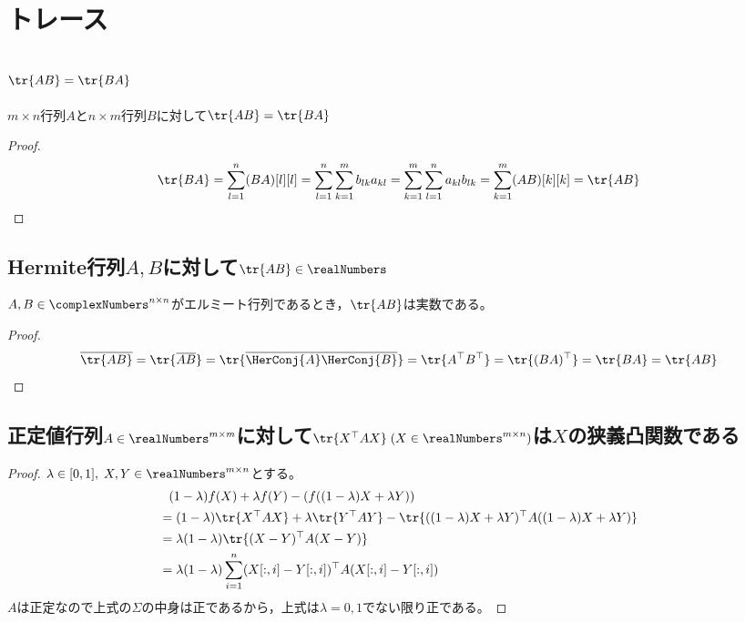 \chapter{トレース}
    \section{\texorpdfstring{$\tr{AB}=\tr{BA}$}{tr(AB)=tr(BA)}}
        \begin{shadebox}
            $m\times n$行列$A$と$n\times m$行列$B$に対して$\tr{AB}=\tr{BA}$
        \end{shadebox}
        \begin{proof}
            \[ \tr{BA} = \sum_{l=1}^n (BA)[l][l] = \sum_{l=1}^n\sum_{k=1}^m b_{lk}a_{kl} = \sum_{k=1}^m\sum_{l=1}^n a_{kl}b_{lk} = \sum_{k=1}^m (AB)[k][k] = \tr{AB} \]
        \end{proof}
    \section{Hermite行列\texorpdfstring{$A,B$}{A,B}に対して\texorpdfstring{$\tr{AB} \in \realNumbers$}{tr(AB)∈R}}
        \begin{shadebox}
            $A,B\in\complexNumbers^{n\times n}$がエルミート行列であるとき，$\tr{AB}$は実数である。
        \end{shadebox}
        \begin{proof}
            \[ \overline{\tr{AB}} = \tr{\overline{AB}} = \tr{\overline{\HerConj{A}\HerConj{B}}} = \tr{A^\top B^\top} = \tr{(BA)^\top} = \tr{BA} = \tr{AB} \]
        \end{proof}
    \section{正定値行列\texorpdfstring{$A \in \realNumbers^{m\times m}$}{A∈R\string^(m×m)}に対して\texorpdfstring{$\tr{X^\top AX}\;(X \in \realNumbers^{m\times n})$}{tr(X\string^AX (X∈R\string^(m×n)))}は\texorpdfstring{$X$}{X}の狭義凸関数である}
        \begin{proof}
            \quad\par
            $\lambda \in [0,1],\;X,Y \in \realNumbers^{m\times n}$とする。
            \begin{align*}
                &\phantom{=} (1-\lambda)f(X) + \lambda f(Y) - \left(f((1-\lambda)X + \lambda Y)\right) \\
                &= (1-\lambda)\tr{X^\top AX} + \lambda\tr{Y^\top AY} - \tr{((1-\lambda)X + \lambda Y)^\top A((1-\lambda)X + \lambda Y)} \\
                &= \lambda(1-\lambda)\tr{(X-Y)^\top A(X-Y)} \\
                &= \lambda(1-\lambda)\sum_{i=1}^n (X[:,i]-Y[:,i])^\top A (X[:,i]-Y[:,i])
            \end{align*}
            $A$は正定なので上式の$\Sigma$の中身は正であるから，上式は$\lambda=0,1$でない限り正である。
        \end{proof}